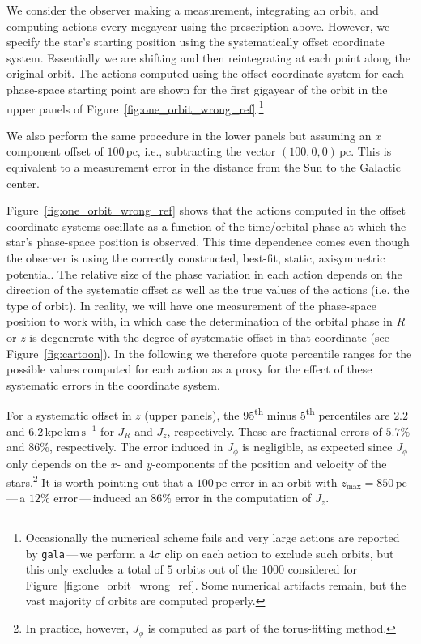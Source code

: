 \documentclass[twocolumn]{aastex62}
\newcommand{\pc}{\text{pc}}
\newcommand{\kms}{\text{km}\,\text{s}^{-1}}
\newcommand{\actunit}{\text{kpc}\,\kms}
\begin{document}
We consider the observer making a measurement, integrating an orbit, and
computing actions every 
megayear 
using the prescription above. However, we
specify the star's starting position using the systematically offset
coordinate system.
Essentially we are shifting and then reintegrating at each point along the original orbit.
The actions computed using the offset coordinate system
for each phase-space starting point are shown for the first gigayear 
of the orbit in the upper panels of
Figure~\ref{fig:one_orbit_wrong_ref}.\footnote{Occasionally the numerical
scheme fails and very large actions are reported by \texttt{gala}\,---\,we perform
a $4\sigma$ clip on each action to exclude such orbits, but this only excludes
a total of $5$ orbits out of the $1000$ considered for
Figure~\ref{fig:one_orbit_wrong_ref}. Some numerical artifacts remain, but the
vast majority of orbits are computed properly.}

We also perform the same procedure in the lower panels but assuming an $x$
component offset of $100\,\pc$, i.e., subtracting the vector $(100, 0,
0)\,\pc$. This is equivalent to a measurement error in the distance from the
Sun to the Galactic center.

Figure~\ref{fig:one_orbit_wrong_ref} shows that the actions computed in the
offset coordinate systems oscillate
as a function of the time/orbital phase at which the
star's phase-space position is observed.
This time dependence comes even though
the observer is using the correctly constructed, best-fit, static, axisymmetric
potential. The relative size of the phase variation in each action depends on
the direction of the systematic offset as well as the true values of the
actions (i.e. the type of orbit). In reality, we will have one measurement of
the phase-space position to work with, in which case the determination of the
orbital phase in $R$ or $z$ is degenerate with the degree of systematic offset
in that coordinate (see Figure~\ref{fig:cartoon}). In the following we
therefore quote percentile ranges for the possible values computed for each
action as a proxy for the effect of these systematic errors in the coordinate
system.

For a systematic offset in $z$ (upper panels), the 95\textsuperscript{th}
minus 5\textsuperscript{th} percentiles are $2.2$ and $6.2\,\actunit$ for
$J_R$ and $J_z$, respectively. These are fractional errors of $5.7\%$ and
$86\%$, respectively. The error induced in $J_{\phi}$ is negligible, as
expected since $J_{\phi}$ only depends on the $x$- and $y$-components of the
position and velocity of the stars.\footnote{In practice, however, $J_{\phi}$
is computed as part of the torus-fitting method.} It is worth pointing out
that a $100\,\pc$ error in an orbit with $z_{\text{max}}=850\,\pc$\,---\,a
$12\%$ error\,---\,induced an $86\%$ error in the computation of $J_z$.
\end{document}
